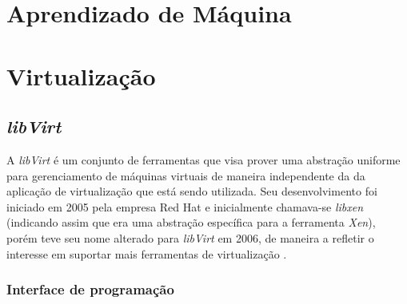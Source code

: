 %
%

\chapter{Aprendizado de Máquina}\label{sec:aprendizado}



\chapter{Virtualização}


\section{\emph{libVirt}}\label{sec:libvirt}


A \emph{libVirt} é um conjunto de ferramentas que visa prover uma abstração
uniforme para gerenciamento de máquinas virtuais de maneira independente da
da aplicação de virtualização que está sendo utilizada. Seu desenvolvimento
foi iniciado em 2005 pela empresa Red Hat e inicialmente chamava-se
\emph{libxen} (indicando assim que era uma abstração específica para a
ferramenta \emph{Xen}), porém teve seu nome alterado para \emph{libVirt} em
2006, de maneira a refletir o interesse em suportar mais ferramentas de
virtualização .

\subsection{Interface de programação}

